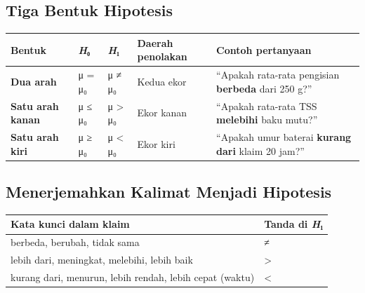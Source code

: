 \documentclass[
  indonesian,
  letterpaper,
]{book}
\newcounter{none} %
\begin{document}
\subsection{Tiga Bentuk Hipotesis}\label{tiga-bentuk-hipotesis}

{\def\LTcaptype{none} %
\begin{longtable}[]{@{}
  >{\raggedright\arraybackslash}p{}
  >{\raggedright\arraybackslash}p{}
  >{\raggedright\arraybackslash}p{}
  >{\raggedright\arraybackslash}p{}
  >{\raggedright\arraybackslash}p{}@{}}
\toprule\noalign{}
\begin{minipage}[b]{\linewidth}\raggedright
Bentuk
\end{minipage} & \begin{minipage}[b]{\linewidth}\raggedright
\emph{H}₀
\end{minipage} & \begin{minipage}[b]{\linewidth}\raggedright
\emph{H}₁
\end{minipage} & \begin{minipage}[b]{\linewidth}\raggedright
Daerah penolakan
\end{minipage} & \begin{minipage}[b]{\linewidth}\raggedright
Contoh pertanyaan
\end{minipage} \\
\midrule\noalign{}
\endhead
\bottomrule\noalign{}
\endlastfoot
\textbf{Dua arah} & μ = μ₀ & μ ≠ μ₀ & Kedua ekor & ``Apakah rata-rata
pengisian \textbf{berbeda} dari 250 g?'' \\
\textbf{Satu arah kanan} & μ ≤ μ₀ & μ \textgreater{} μ₀ & Ekor kanan &
``Apakah rata-rata TSS \textbf{melebihi} baku mutu?'' \\
\textbf{Satu arah kiri} & μ ≥ μ₀ & μ \textless{} μ₀ & Ekor kiri &
``Apakah umur baterai \textbf{kurang dari} klaim 20 jam?'' \\
\end{longtable}
}

\subsection{Menerjemahkan Kalimat Menjadi
Hipotesis}\label{menerjemahkan-kalimat-menjadi-hipotesis}

{\def\LTcaptype{none} %
\begin{longtable}[]{@{}ll@{}}
\toprule\noalign{}
Kata kunci dalam klaim & Tanda di \emph{H}₁ \\
\midrule\noalign{}
\endhead
\bottomrule\noalign{}
\endlastfoot
berbeda, berubah, tidak sama & ≠ \\
lebih dari, meningkat, melebihi, lebih baik & \textgreater{} \\
kurang dari, menurun, lebih rendah, lebih cepat (waktu) & \textless{} \\
\end{longtable}
}
\end{document}
